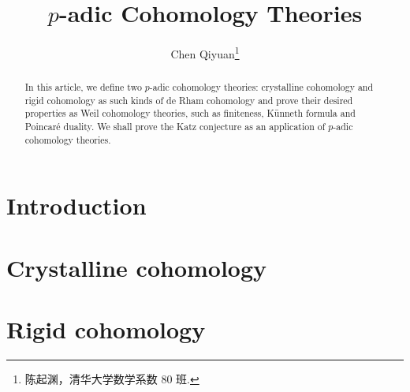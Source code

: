 \documentclass[twoside]{article}
\begin{document}
\title{$p$-adic Cohomology Theories}
\author{Chen Qiyuan\footnote{陈起渊，清华大学数学系数 80 班.}}

\begin{abstract}
    In this article, we define two $p$-adic cohomology theories:
    crystalline cohomology and rigid cohomology as such kinds of de Rham cohomology 
    and prove their desired properties as Weil cohomology theories, 
    such as finiteness, K\"unneth formula and Poincar\'e duality. 
    We shall prove the Katz conjecture as an application of $p$-adic cohomology theories. 
\end{abstract}

\tableofcontents

\section{Introduction}



\section{Crystalline cohomology}



\section{Rigid cohomology}



\printbibliography
\end{document}
